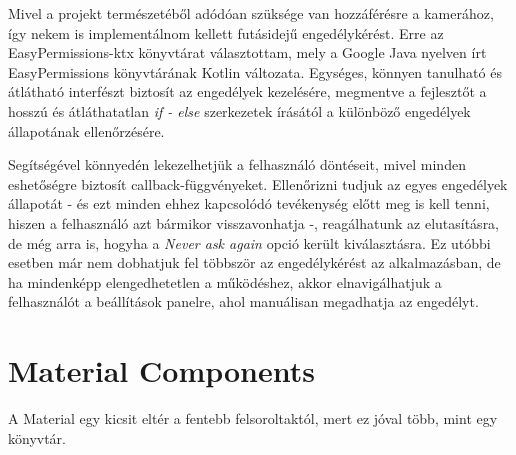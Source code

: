 Mivel a projekt természetéből adódóan szüksége van hozzáférésre a kamerához, így nekem is implementálnom kellett futásidejű engedélykérést. Erre az EasyPermissions-ktx könyvtárat választottam, mely a Google Java nyelven írt EasyPermissions könyvtárának Kotlin változata. Egységes, könnyen tanulható és átlátható interfészt biztosít az engedélyek kezelésére, megmentve a fejlesztőt a hosszú és átláthatatlan \emph{if - else} szerkezetek írásától a különböző engedélyek állapotának ellenőrzésére. 

Segítségével könnyedén lekezelhetjük a felhasználó döntéseit, mivel minden eshetőségre biztosít callback-függvényeket. Ellenőrizni tudjuk az egyes engedélyek állapotát - és ezt minden ehhez kapcsolódó tevékenység előtt meg is kell tenni, hiszen a felhasználó azt bármikor visszavonhatja -, reagálhatunk az elutasításra, de még arra is, hogyha a \emph{Never ask again} opció került kiválasztásra. Ez utóbbi esetben már nem dobhatjuk fel többször az engedélykérést az alkalmazásban, de ha mindenképp elengedhetetlen a működéshez, akkor elnavigálhatjuk a felhasználót a beállítások panelre, ahol manuálisan megadhatja az engedélyt. 

\section{Material Components}

A Material egy kicsit eltér a fentebb felsoroltaktól, mert ez jóval több, mint egy könyvtár. 